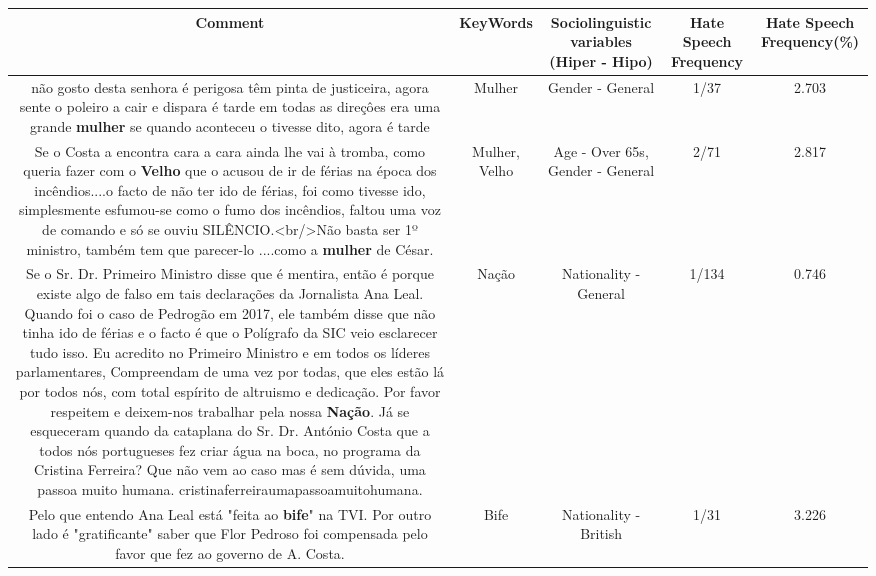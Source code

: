 \documentclass[11pt]{article}
\newlength\mylength
\begin{document}
\begin{center}
\setlength\mylength{\dimexpr\textwidth - 1\arrayrulewidth - 50\tabcolsep}
\begin{longtable}{|C{.65\mylength}|C{.30\mylength}|C{.12\mylength}|C{.12\mylength}|C{.12\mylength}|}
\hline
\textbf{Comment} & \textbf{KeyWords} & \textbf{Sociolinguistic variables (Hiper - Hipo)}  & \textbf{Hate Speech Frequency} & \textbf{Hate Speech Frequency(\%)} \\
\hline{}\small não gosto desta senhora é perigosa têm pinta de justiceira, agora sente o poleiro a cair e dispara é tarde em todas as direçôes era uma grande \textbf{mulher} se quando aconteceu  o tivesse dito, agora é tarde\normalsize   & Mulher & Gender - General & 1/37 & 2.703 \\  \hline
  \small Se o Costa a encontra cara a cara ainda lhe vai à tromba, como queria fazer com o \textbf{Velho} que o acusou de ir de férias na época dos incêndios....o facto de não ter ido de férias, foi como tivesse ido, simplesmente esfumou-se como o fumo dos incêndios, faltou uma voz de comando e só se ouviu SILÊNCIO.<br/>Não basta ser 1º ministro, também tem que parecer-lo ....como a \textbf{mulher} de César.\normalsize   & Mulher, Velho & Age - Over 65s, Gender - General & 2/71 & 2.817 \\  \hline
  \small Se o Sr. Dr. Primeiro Ministro disse que é mentira, então é porque existe algo de falso em tais declarações da Jornalista Ana Leal. Quando foi o caso de Pedrogão em 2017, ele também disse que não tinha ido de férias e o facto é que o Polígrafo da SIC veio esclarecer tudo isso. Eu acredito no Primeiro Ministro e em todos os líderes parlamentares, Compreendam de uma vez por todas, que eles estão lá por todos nós, com total espírito de altruismo e dedicação. Por favor respeitem e deixem-nos trabalhar pela nossa \textbf{Nação}. Já se esqueceram quando da cataplana do Sr. Dr. António Costa que a todos nós portugueses fez criar água na boca, no programa da Cristina Ferreira? Que não vem ao caso mas é sem dúvida, uma passoa muito humana. cristinaferreiraumapassoamuitohumana.\normalsize   & Nação & Nationality - General & 1/134 & 0.746 \\  \hline
  \small Pelo que entendo Ana Leal está "feita ao \textbf{bife}" na TVI. Por outro lado é "gratificante" saber que Flor Pedroso foi compensada pelo favor que fez ao governo de A. Costa.\normalsize   & Bife & Nationality - British & 1/31 & 3.226 \\  \hline

\end{longtable}
\end{center}
\end{document}

